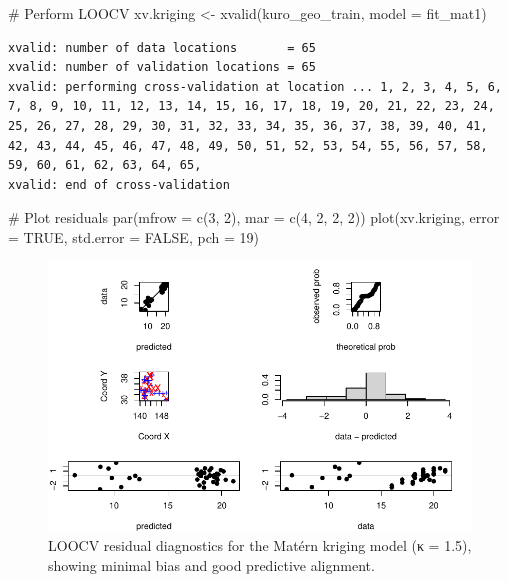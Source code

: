 \documentclass[
  11pt,
]{article}
\newenvironment{Shaded}{\begin{snugshade}}{\end{snugshade}}
\newcommand{\AttributeTok}[1]{\textcolor[rgb]{0.40,0.45,0.13}{#1}}
\newcommand{\CommentTok}[1]{\textcolor[rgb]{0.37,0.37,0.37}{#1}}
\newcommand{\ConstantTok}[1]{\textcolor[rgb]{0.56,0.35,0.01}{#1}}
\newcommand{\DecValTok}[1]{\textcolor[rgb]{0.68,0.00,0.00}{#1}}
\newcommand{\FunctionTok}[1]{\textcolor[rgb]{0.28,0.35,0.67}{#1}}
\newcommand{\NormalTok}[1]{\textcolor[rgb]{0.00,0.23,0.31}{#1}}
\newcommand{\OtherTok}[1]{\textcolor[rgb]{0.00,0.23,0.31}{#1}}
\begin{document}
\begin{Shaded}
\begin{Highlighting}[]
\CommentTok{\# Perform LOOCV}
\NormalTok{xv.kriging }\OtherTok{\textless{}{-}} \FunctionTok{xvalid}\NormalTok{(kuro\_geo\_train, }\AttributeTok{model =}\NormalTok{ fit\_mat1)}
\end{Highlighting}
\end{Shaded}

\begin{verbatim}
xvalid: number of data locations       = 65
xvalid: number of validation locations = 65
xvalid: performing cross-validation at location ... 1, 2, 3, 4, 5, 6, 7, 8, 9, 10, 11, 12, 13, 14, 15, 16, 17, 18, 19, 20, 21, 22, 23, 24, 25, 26, 27, 28, 29, 30, 31, 32, 33, 34, 35, 36, 37, 38, 39, 40, 41, 42, 43, 44, 45, 46, 47, 48, 49, 50, 51, 52, 53, 54, 55, 56, 57, 58, 59, 60, 61, 62, 63, 64, 65, 
xvalid: end of cross-validation
\end{verbatim}

\begin{Shaded}
\begin{Highlighting}[]
\CommentTok{\# Plot residuals}
\FunctionTok{par}\NormalTok{(}\AttributeTok{mfrow =} \FunctionTok{c}\NormalTok{(}\DecValTok{3}\NormalTok{, }\DecValTok{2}\NormalTok{), }\AttributeTok{mar =} \FunctionTok{c}\NormalTok{(}\DecValTok{4}\NormalTok{, }\DecValTok{2}\NormalTok{, }\DecValTok{2}\NormalTok{, }\DecValTok{2}\NormalTok{))}
\FunctionTok{plot}\NormalTok{(xv.kriging, }\AttributeTok{error =} \ConstantTok{TRUE}\NormalTok{, }\AttributeTok{std.error =} \ConstantTok{FALSE}\NormalTok{, }\AttributeTok{pch =} \DecValTok{19}\NormalTok{)}
\end{Highlighting}
\end{Shaded}

\begin{figure}[H]

{\centering \includegraphics{project_files/figure-pdf/fig-cvkrig-1.pdf}

}

\caption{LOOCV residual diagnostics for the Matérn kriging model (κ =
1.5), showing minimal bias and good predictive alignment.}

\end{figure}%
\end{document}
